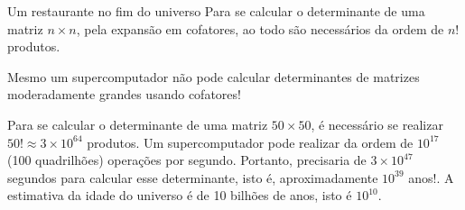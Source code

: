 \begin{frame}[label=determinantes]
\begin{block}{Um restaurante no fim do universo}
Para se calcular o determinante de uma matriz $n\times n$, pela expansão em cofatores, ao todo são necessários da ordem de $n!$ produtos.
\medskip


Mesmo um supercomputador não pode calcular determinantes de matrizes moderadamente grandes usando cofatores!
\medskip


Para se calcular o determinante de uma matriz $50\times 50$, é necessário se realizar $50!\approx 3\times  10^{64}$ produtos. Um supercomputador pode realizar da ordem de $10^{17}$ (100 quadrilhões) operações por segundo. Portanto, precisaria de $3\times 10^{47}$ segundos para calcular esse determinante, isto é, aproximadamente $10^{39}$ anos!. A estimativa da idade do universo é de 10 bilhões de anos, isto é $10^{10}$.
\end{block}
\end{frame}

